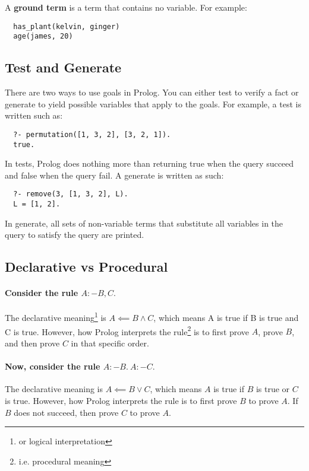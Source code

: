 \documentclass{article}
\begin{document}
\begin{multicols}{2}
  \noindent A {\bf ground term} is a term that contains no variable. For example:
  
  \begin{lstlisting}
  has_plant(kelvin, ginger)
  age(james, 20)
  \end{lstlisting}
  
  \subsection{Test and Generate}
  
  There are two ways to use goals in Prolog. You can either test to verify a fact or generate to yield possible variables that apply to the goals. For example, a test is written such as:
  
  \begin{lstlisting}
  ?- permutation([1, 3, 2], [3, 2, 1]).
  true.
  \end{lstlisting}
  
  In tests, Prolog does nothing more than returning true when the query succeed and false when the query fail. A generate is written as such:
  
  \begin{lstlisting}
  ?- remove(3, [1, 3, 2], L).
  L = [1, 2].
  \end{lstlisting}
  
  In generate, all sets of non-variable terms that substitute all variables in the query to satisfy the query are printed.
  
  \subsection{Declarative vs Procedural}
  
  \paragraph{Consider the rule $A :- B, C.$} The declarative meaning\footnote{or logical interpretation} is $A \impliedby B \land C$, which means A is true if B is true and C is true. However, how Prolog interprets the rule\footnote{i.e. procedural meaning} is to first prove $A$, prove $B$, and then prove $C$ in that specific order. 
  
  \paragraph{Now, consider the rule $A :- B.\ A :- C.$} The declarative meaning is $A \impliedby B \lor C$, which means $A$ is true if $B$ is true or $C$ is true. However, how Prolog interprets the rule is to first prove $B$ to prove $A$. If $B$ does not succeed, then prove $C$ to prove $A$. 
  

\end{multicols}
\end{document}
